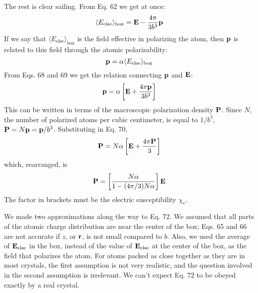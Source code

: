 The rest is clear sailing. From Eq. 62 we get at once:
\begin{equation}
  \langle E_\text{else}\rangle_\text{box} = \mathbf{E}-\frac{4\pi}{3b^3}\mathbf{p}
\end{equation}
If we say that $\langle E_\text{else}\rangle_\text{box}$ is the field effective in polarizing the atom,
then $\mathbf{p}$ is related to this field through the atomic polarizability:
\begin{equation}
  \mathbf{p} = \alpha \langle E_\text{else}\rangle_\text{box}
\end{equation}
From Eqs. 68 and 69 we get the relation connecting $\mathbf{p}$ and $\mathbf{E}$:
\begin{equation}
  \mathbf{p} = \alpha\left[\mathbf{E}+\frac{4\pi\mathbf{p}}{3b^3}\right]
\end{equation}
This can be written in terms of the macroscopic polarization density
$\mathbf{P}$. Since $N$, the number of polarized atoms per cubic centimeter, is
equal to $1/b^3$, $\mathbf{P} = N\mathbf{p} = \mathbf{p}/b^3$. Substituting in Eq. 70,
\begin{equation}
  \mathbf{P} = N\alpha\left[\mathbf{E}+\frac{4\pi\mathbf{P}}{3}\right]
\end{equation}
which, rearranged, is
\begin{equation}
  \mathbf{P} = \left[\frac{N\alpha}{1-(4\pi/3)N\alpha}\right]\mathbf{E}
\end{equation}
The factor in brackets must be the electric susceptibility $\chi_e$.

We made two approximations along the way to Eq. 72. We assumed
that all parts of the atomic charge distribution are near the
center of the box; Eqs. 65 and 66 are not accurate if $z$, or $\mathbf{r}$, is not
small compared to $b$. Also, we used the average of $\mathbf{E}_\text{else}$ in the box,
instead of the value of $\mathbf{E}_\text{else}$ at the center of the box, as the field that
polarizes the atom. For atoms packed as close together as they are
in most crystals, the first assumption is not very realistic, and the
question involved in the second assumption is irrelevant. We can't
expect Eq. 72 to be obeyed exactly by a real crystal.

